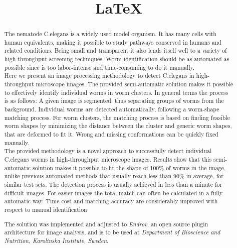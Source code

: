 \documentclass[12pt]{article}
\title{\LaTeX}
\date{}
\begin{document}
  \maketitle 
  \begin{abstract}



The nematode C.elegans is a widely used model organism. It has many cells with
human equivalents, making it possible to study pathways conserved in humans
and related conditions. Being small and transparent it also lends itself well to
a variety of high-throughput screening techniques.
Worm identification should be as automated
as possible since is too labor-intense and time-consuming to do it manually.\\

Here we present an image processing methodology to detect 
C.elegans in high-throughput microscope images. 
The provided semi-automatic solution makes it possible to effectively identify individual 
worms in worm clusters. In general terms the process is as follows: 
A given image is segmented, thus 
separating groups of worms from the background. Individual worms are detected
automatically, following a worm-shape matching process. For worm clusters, the 
matching process
is based on finding feasible worm shapes by minimizing the distance between
the cluster and generic worm shapes, that are deformed to fit it.
Wrong and missing conformations can be quickly fixed manually. \\

The provided methodology is a novel approach 
to successfully detect individual C.elegans worms in high-throughput microscope images.
Results show that this semi-automatic solution makes it possible to fit the shape of
100\% of worms in the image, unlike previous automated methods that usually reach less 
than 90\% in average, for similar test sets.
The detection process is usually achieved in less than a minute for difficult images. 
For easier images the total match can often be calculated in a fully automatic way.
Time cost and matching accuracy are considerably improved 
with respect to manual identification

The solution was implemented and adjusted to \emph{Endrov}, an open source
plugin architecture for image analysis, and is to be used at 
\emph{Department of Bioscience and Nutrition, Karolinska Institute, Sweden}. 
  \end{abstract}
\end{document}
